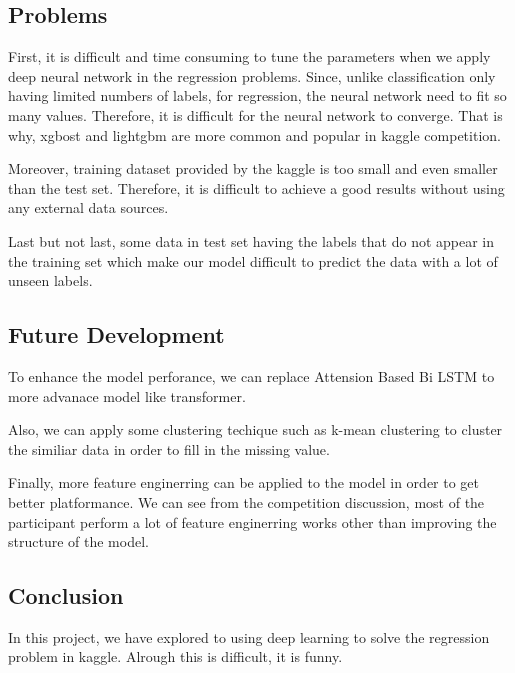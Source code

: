 \documentclass{article}
\begin{document}
\subsection{Problems}

First, it is difficult and time consuming to tune the parameters when we apply deep neural network in the regression problems. Since, unlike classification only having limited numbers of labels, for regression, the neural network need to fit so many values. Therefore, it is difficult for the neural network to converge. That is why, xgbost and lightgbm are more common and popular in kaggle competition. 

Moreover, training dataset provided by the kaggle is too small and even smaller than the test set. Therefore, it is difficult to achieve a good results without using any external data sources.

Last but not last, some data in test set having the labels that do not appear in the training set which make our model difficult to predict the data with a lot of unseen labels.

\subsection{Future Development}

To enhance the model perforance, we can replace Attension Based Bi LSTM to more advanace model like transformer.

Also, we can apply some clustering techique such as k-mean clustering to cluster the similiar data in order to fill in the missing value.

Finally, more feature enginerring can be applied to the model in order to get better platformance. We can see from the competition discussion, most of the participant perform a lot of feature enginerring works other than improving the structure of the model. 

\subsection{Conclusion}

In this project, we have explored to using deep learning to solve the regression problem in kaggle. Alrough this is difficult, it is funny.
\end{document}
